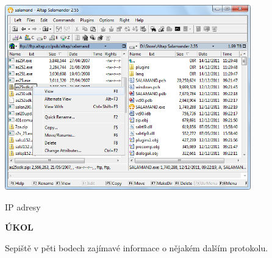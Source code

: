 \documentclass[aspectratio=169]{beamer}
\begin{document}
\begin{frame}
    \begin{center}
    \includegraphics[width=0.8\textwidth]{img/ftp.png}
    \end{center}
\end{frame}



\begin{frame}{IP adresy}
    \begin{cardTiny}
        \begin{center}
            \textbf{ÚKOL}
        \end{center}
        \begin{flushleft}
            Sepiště v pěti bodech zajímavé informace o nějakém dalším protokolu.
        \end{flushleft}
    \end{cardTiny}
\end{frame}
\end{document}
